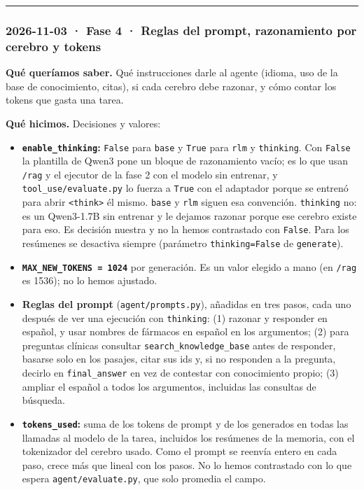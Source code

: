 \begin{center}\rule{0.5\linewidth}{0.5pt}\end{center}

\subsubsection{2026-11-03 · Fase 4 · Reglas del prompt, razonamiento por cerebro y tokens}

\textbf{Qué queríamos saber.} Qué instrucciones darle al agente (idioma, uso de la base de conocimiento,
citas), si cada cerebro debe razonar, y cómo contar los tokens que gasta una tarea.

\textbf{Qué hicimos.} Decisiones y valores:

\begin{itemize}
\tightlist
\item
  \textbf{\texttt{enable\_\allowbreak{}thinking}:} \texttt{False} para \texttt{base} y \texttt{True} para \texttt{rlm} y \texttt{thinking}. Con \texttt{False} la plantilla
  de Qwen3 pone un bloque de razonamiento vacío; es lo que usan \texttt{/\allowbreak{}rag} y el ejecutor de la fase 2 con
  el modelo sin entrenar, y \texttt{tool\_\allowbreak{}use/\allowbreak{}evaluate.py} lo fuerza a \texttt{True} con el adaptador porque se
  entrenó para abrir \texttt{\textless{}think\textgreater{}} él mismo. \texttt{base} y \texttt{rlm} siguen esa convención. \texttt{thinking} no: es un
  Qwen3-1.7B sin entrenar y le dejamos razonar porque ese cerebro existe para eso. Es decisión nuestra
  y no la hemos contrastado con \texttt{False}. Para los resúmenes se desactiva siempre (parámetro
  \texttt{thinking=\allowbreak{}False} de \texttt{generate}).
\item
  \textbf{\texttt{MAX\_\allowbreak{}NEW\_\allowbreak{}TOKENS =\allowbreak{} 1024}} por generación. Es un valor elegido a mano (en \texttt{/\allowbreak{}rag} es 1536); no lo
  hemos ajustado.
\item
  \textbf{Reglas del prompt} (\texttt{agent/\allowbreak{}prompts.py}), añadidas en tres pasos, cada uno después de ver una
  ejecución con \texttt{thinking}: (1) razonar y responder en español, y usar nombres de fármacos en español
  en los argumentos; (2) para preguntas clínicas consultar \texttt{search\_\allowbreak{}knowledge\_\allowbreak{}base} antes de responder,
  basarse solo en los pasajes, citar sus ids y, si no responden a la pregunta, decirlo en
  \texttt{final\_\allowbreak{}answer} en vez de contestar con conocimiento propio; (3) ampliar el español a todos los
  argumentos, incluidas las consultas de búsqueda.
\item
  \textbf{\texttt{tokens\_\allowbreak{}used}:} suma de los tokens de prompt y de los generados en todas las llamadas al modelo de
  la tarea, incluidos los resúmenes de la memoria, con el tokenizador del cerebro usado. Como el prompt
  se reenvía entero en cada paso, crece más que lineal con los pasos. No lo hemos contrastado con lo
  que espera \texttt{agent/\allowbreak{}evaluate.py}, que solo promedia el campo.
\end{itemize}

